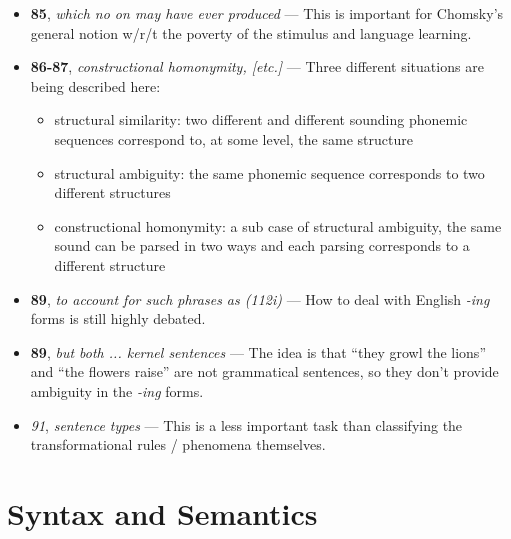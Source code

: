 \documentclass[12pt]{article}
\begin{document}
\begin{itemize}

\item \textbf{85}, \textit{which no on may have ever produced} --- This is important for Chomsky's general notion w/r/t the poverty of the stimulus and language learning.

\item \textbf{86-87}, \textit{constructional homonymity, [etc.]} --- Three different situations are being described here:
    \begin{itemize}
    \item structural similarity: two different and different sounding phonemic sequences correspond to, at some level, the same structure
    \item structural ambiguity: the same phonemic sequence corresponds to two different structures
    \item constructional homonymity: a sub case of structural ambiguity, the same sound can be parsed in two ways and each parsing corresponds to a different structure
    \end{itemize}

\item \textbf{89}, \textit{to account for such phrases as (112i)} --- How to deal with English \textit{-ing} forms is still highly debated.

\item \textbf{89}, \textit{but both ... kernel sentences} --- The idea is that ``they growl the lions'' and ``the flowers raise'' are not grammatical sentences, so they don't provide ambiguity in the \textit{-ing} forms.

\item \textit{91}, \textit{sentence types} --- This is a less important task than classifying the transformational rules / phenomena themselves.

\end{itemize}

\section{Syntax and Semantics}
\end{document}
